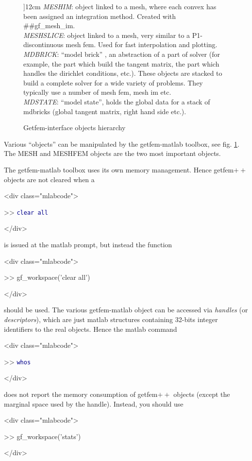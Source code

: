 \documentclass[11pt,a4paper]{article}
\newcommand{\sf}[1]{#1}
\newcommand{\kw}[1]{\textcolor{darkblue}{\texttt{#1}}}
\newenvironment{minipage}[2]{}{}
\newenvironment{matlab}{\begin{rawxml}<div class="mlabcode">\end{rawxml}\begin{example}}{\end{example}\begin{rawxml}</div>\end{rawxml}}
\newcommand{\kw}[1]{\textcolor{darkblue}{\texttt{#1}}}
\newenvironment{matlab}{\begin{alltt}}{\end{alltt}}
\newcommand{\mf}{mesh fem\xspace}
\newcommand{\mim}{mesh im\xspace}
\newcommand{\mlab}{{\sf matlab}\xspace}
\newcommand{\gf}{{\sf getfem${++}$}\xspace}
\newcommand{\Gfi}{{\sf Getfem-interface}\xspace}
\newcommand{\gfm}{{\sf getfem-matlab}\xspace}
\begin{document}
\begin{figure}
\begin{center}
\begin{minipage}[c]{12cm}
  \textit{MESHIM}: object linked to a mesh, where each convex has been
  assigned an integration method. Created with  ##gf\_mesh\_im.\\
  \textit{MESHSLICE}: object linked to a mesh, very similar to a P1-discontinuous \mf. Used for fast interpolation and plotting.\\
   \textit{MDBRICK}: ``model brick'' , an abstraction of a part of solver (for example, the part which build the tangent matrix, the part which handles the dirichlet conditions, etc.). These objects are stacked to build a complete solver for a wide variety of problems. They typically use a number of \mf, \mim etc.\\
   \textit{MDSTATE}: ``model state'', holds the global data for a stack of mdbricks (global tangent matrix, right hand side etc.).
\T \end{minipage}
\T \end{center}
\caption{\Gfi objects hierarchy}\label{fig:hierarchy}
\end{figure}
Various ``objects'' can be manipulated by the \gfm toolbox, see fig. \ref{fig:hierarchy}. The MESH and MESHFEM objects are the two most important objects. 

The \gfm toolbox uses its own memory management. Hence \gf objects are
not cleared when a 
\begin{matlab}
>> \kw{clear all}
\end{matlab}
is issued at the \mlab prompt, but
instead the function 
\begin{matlab}
>> gf\_workspace('clear all')
\end{matlab}
should be used. The various \gfm object can be accessed via \textit{handles} (or
\textit{descriptors}), which are just \mlab structures containing 32-bits integer identifiers to
the real objects. Hence the \mlab command 
\begin{matlab}
>> \kw{whos}
\end{matlab}
does not report the memory consumption of \gf objects (except the marginal space
 used by the handle). Instead, you should use
\begin{matlab}
>> gf\_workspace('stats')
\end{matlab}
\end{document}
